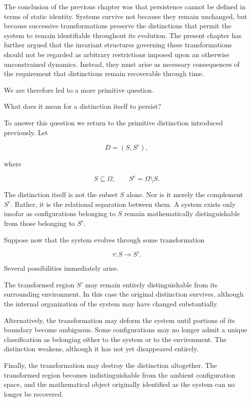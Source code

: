 \documentclass[11pt]{book}
\numberwithin{equation}{chapter}
\theoremstyle{definition}
\theoremstyle{plain}
\begin{document}
The conclusion of the previous chapter was that persistence cannot be defined in terms of static identity. Systems survive not because they remain unchanged, but because successive transformations preserve the distinctions that permit the system to remain identifiable throughout its evolution. The present chapter has further argued that the invariant structures governing these transformations should not be regarded as arbitrary restrictions imposed upon an otherwise unconstrained dynamics. Instead, they must arise as necessary consequences of the requirement that distinctions remain recoverable through time.

We are therefore led to a more primitive question.

What does it mean for a distinction itself to persist?

To answer this question we return to the primitive distinction introduced previously. Let

\[
D=(S,S^{c}),
\]

where

\[
S\subseteq\Omega,
\qquad
S^{c}=\Omega\setminus S.
\]

The distinction itself is not the subset \(S\) alone. Nor is it merely the complement \(S^{c}\). Rather, it is the relational separation between them. A system exists only insofar as configurations belonging to \(S\) remain mathematically distinguishable from those belonging to \(S^{c}\).

Suppose now that the system evolves through some transformation

\[
\tau:S\longrightarrow S'.
\]

Several possibilities immediately arise.

The transformed region \(S'\) may remain entirely distinguishable from its surrounding environment. In this case the original distinction survives, although the internal organization of the system may have changed substantially.

Alternatively, the transformation may deform the system until portions of its boundary become ambiguous. Some configurations may no longer admit a unique classification as belonging either to the system or to the environment. The distinction weakens, although it has not yet disappeared entirely.

Finally, the transformation may destroy the distinction altogether. The transformed region becomes indistinguishable from the ambient configuration space, and the mathematical object originally identified as the system can no longer be recovered.
\end{document}
